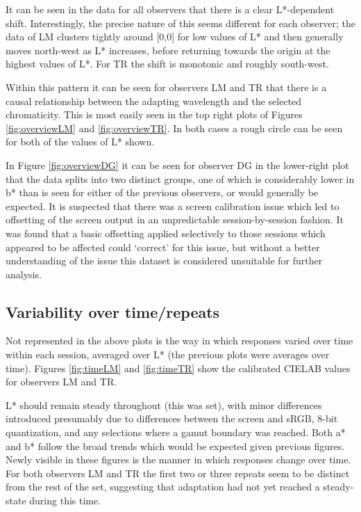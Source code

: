 It can be seen in the data for all observers that there is a clear L*-dependent shift. Interestingly, the precise nature of this seems different for each observer; the data of LM clusters tightly around [0,0] for low values of L* and then generally moves north-west as L* increases, before returning towards the origin at the highest values of L*. For TR the shift is monotonic and roughly south-west.

Within this pattern it can be seen for observers LM and TR that there is a causal relationship between the adapting wavelength and the selected chromaticity. This is most easily seen in the top right plots of Figures \ref{fig:overviewLM} and \ref{fig:overviewTR}. In both cases a rough circle can be seen for both of the values of L* shown.

In Figure \ref{fig:overviewDG} it can be seen for observer DG in the lower-right plot that the data splits into two distinct groups, one of which is considerably lower in b* than is seen for either of the previous observers, or would generally be expected. It is suspected that there was a screen calibration issue which led to offsetting of the screen output in an unpredictable session-by-session fashion. It was found that a basic offsetting applied selectively to those sessions which appeared to be affected could `correct' for this issue, but without a better understanding of the issue this dataset is considered unsuitable for further analysis.

\subsection{Variability over time/repeats}

Not represented in the above plots is the way in which responses varied over time within each session, averaged over L* (the previous plots were averages over time). Figures \ref{fig:timeLM} and \ref{fig:timeTR} show the calibrated CIELAB values for observers LM and TR. 

L* should remain steady throughout (this was set), with minor differences introduced presumably due to differences between the screen and sRGB, 8-bit quantization, and any selections where a gamut boundary was reached. Both a* and b* follow the broad trends which would be expected given previous figures. Newly visible in these figures is the manner in which responses change over time. For both observers LM and TR the first two or three repeats seem to be distinct from the rest of the set, suggesting that adaptation had not yet reached a steady-state during this time.

